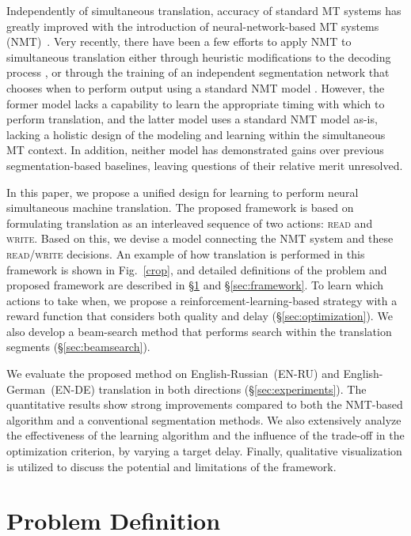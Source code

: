 Independently of simultaneous translation, accuracy of standard MT systems has greatly improved with the introduction of neural-network-based MT systems (NMT)~\cite{sutskever2014sequence,bahdanau2014neural}.
Very recently, there have been a few efforts to apply NMT to simultaneous translation either through heuristic modifications to the decoding process \cite{cho2016can}, or through the training of an independent segmentation network that chooses when to perform output using a standard NMT model \cite{satija2016simultaneous}.
However, the former model lacks a capability to learn the appropriate timing with which to perform translation, and the latter model uses a standard NMT model as-is, lacking a holistic design of the modeling and learning within the simultaneous MT context.
In addition, neither model has demonstrated gains over previous segmentation-based baselines, leaving questions of their relative merit unresolved.

  
In this paper, we propose a unified design for learning to perform neural simultaneous machine translation.
The proposed framework is based on formulating translation as an interleaved sequence of two actions: \textsc{read} and \textsc{write}.
Based on this, we devise a model connecting the NMT system and these \textsc{read}/\textsc{write} decisions.
An example of how translation is performed in this framework is shown in Fig.~\ref{crop}, and detailed definitions of the problem and proposed framework are described in \S\ref{sec:definition} and \S\ref{sec:framework}.
To learn which actions to take when, we propose a reinforcement-learning-based strategy with a reward function that considers both quality and delay (\S\ref{sec:optimization}).
We also develop a beam-search method that performs search within the translation segments (\S\ref{sec:beamsearch}).

We evaluate the proposed method on English-Russian~(EN-RU) and English-German~(EN-DE) translation in both directions (\S\ref{sec:experiments}).
The quantitative results show strong improvements compared to both the NMT-based algorithm and a conventional segmentation methods.
We also extensively analyze the effectiveness of the learning algorithm and the influence of the trade-off in the optimization criterion, by varying a target delay.
Finally, qualitative visualization is utilized to discuss the potential and limitations of the framework.


\section{Problem Definition}
\label{sec:definition}
\vspace{-5pt}

